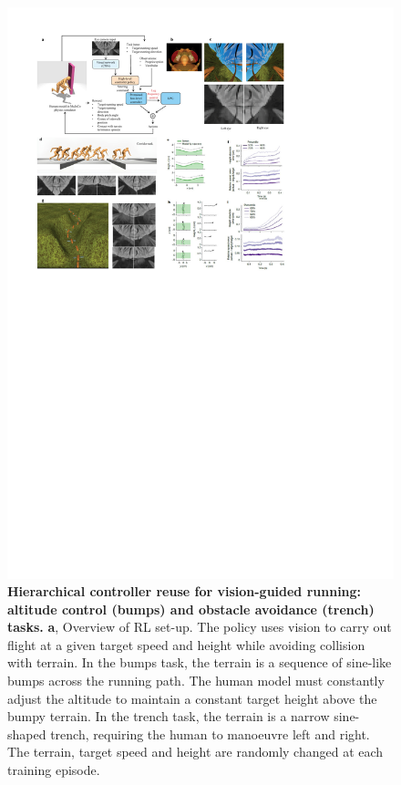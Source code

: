 \documentclass[sn-mathphys-num]{sn-jnl}%
\theoremstyle{thmstyleone}%
\theoremstyle{thmstyletwo}%
\theoremstyle{thmstylethree}%
\begin{document}
\begin{figure}[!htb]
	\centering
	\includegraphics[width=1.0\textwidth]{fig/fig_4.pdf}
	\caption{
		\textbf{Hierarchical controller reuse for vision-guided running: altitude control (bumps) and obstacle avoidance (trench) tasks.} 
		\textbf{a}, Overview of RL set-up. 
		The policy uses vision to carry out flight at a given target speed and height while avoiding collision with terrain. 
		In the bumps task, the terrain is a sequence of sine-like bumps across the running path. 
		The human model must constantly adjust the altitude to maintain a constant target height above the bumpy terrain. 
		In the trench task, the terrain is a narrow sine-shaped trench, requiring the human to manoeuvre left and right. 
		The terrain, target speed and height are randomly changed at each training episode. 
}
\end{figure}
\end{document}

